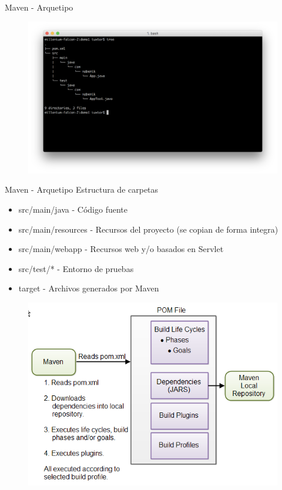 \documentclass[aspectratio=169]{beamer}
\begin{document}
\begin{frame}{Maven - Arquetipo}
\begin{figure}
	\centering
	\includegraphics[width=\linewidth]{Images/mvn2}
\end{figure}
\end{frame}

\begin{frame}{Maven - Arquetipo}
Estructura de carpetas
\begin{itemize}
	\item src/main/java - Código fuente
	\item src/main/resources - Recursos del proyecto (se copian de forma integra)
	\item src/main/webapp - Recursos web y/o basados en Servlet
    \item src/test/* - Entorno de pruebas
    \item target - Archivos generados por Maven
\end{itemize}
\end{frame}

\begin{frame}{}
\begin{figure}
	\centering
	\includegraphics[width=0.8\linewidth]{Images/maven0}
\end{figure}
\end{frame}
\end{document}
